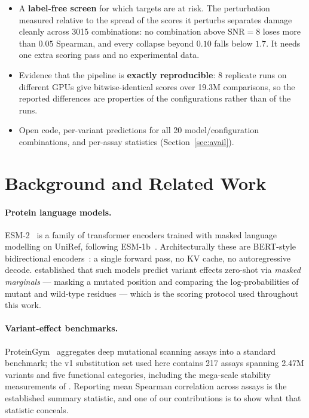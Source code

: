 \documentclass[11pt]{article}
\begin{document}
\begin{itemize}
        \textbf{defect of default symmetric activation scaling, not of W8A8}:
        asymmetric activation quantization --- one keyword, no calibration ---
        removes all six damaged assays and improves worst-case drift from
        $\rho_{\text{fp32}} = 0.393$ to $0.965$, and SmoothQuant does the same
        at higher cost. ``Avoid INT8 dynamic quantization'' would have been the
        wrong conclusion from the same benchmark.
  \item A \textbf{label-free screen} for which targets are at risk. The
        perturbation measured relative to the spread of the scores it perturbs
        separates damage cleanly across 3015 combinations: no combination above
        $\mathrm{SNR} = 8$ loses more than $0.05$ Spearman, and every collapse
        beyond $0.10$ falls below $1.7$. It needs one extra scoring pass and no
        experimental data.
  \item Evidence that the pipeline is \textbf{exactly reproducible}: 8
        replicate runs on different GPUs give bitwise-identical scores over
        19.3M comparisons, so the reported differences are properties of the
        configurations rather than of the runs.
  \item Open code, per-variant predictions for all 20 model/configuration
        combinations, and per-assay statistics (Section~\ref{sec:avail}).
\end{itemize}

\section{Background and Related Work}

\paragraph{Protein language models.} ESM-2~\cite{lin2023esm2} is a family of
transformer encoders trained with masked language modelling on UniRef, following
ESM-1b~\cite{rives2021}. Architecturally these are BERT-style bidirectional
encoders~\cite{devlin2019bert}: a single forward pass, no KV cache, no
autoregressive decode. \citet{meier2021} established that such models predict
variant effects zero-shot via \emph{masked marginals} --- masking a mutated
position and comparing the log-probabilities of mutant and wild-type residues ---
which is the scoring protocol used throughout this work.

\paragraph{Variant-effect benchmarks.} ProteinGym~\cite{notin2023proteingym}
aggregates deep mutational scanning assays into a standard benchmark; the v1
substitution set used here contains 217 assays spanning 2.47M variants and five
functional categories, including the mega-scale stability measurements of
\citet{tsuboyama2023}. Reporting mean Spearman correlation across assays is the
established summary statistic, and one of our contributions is to show what that
statistic conceals.
\end{document}

